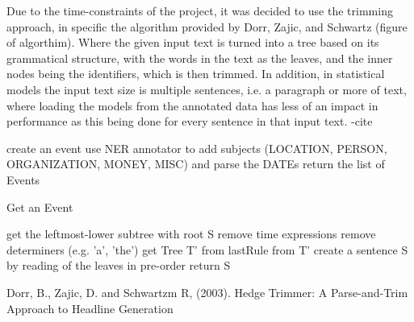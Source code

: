 \par Due to the time-constraints of the project, it was decided to use the trimming approach, in specific the algorithm provided by Dorr, Zajic, and Schwartz \cite{dorrzajicschwartz2003} (figure of algorthim). Where the given input text is turned into a tree based on its grammatical structure, with the words in the text as the leaves, and the inner nodes being the identifiers, which is then trimmed. In addition, in statistical models the input text size is multiple sentences, i.e. a paragraph or more of text, where loading the models from the annotated data has less of an impact in performance as this being done for every sentence in that input text. 
-cite
\begin{algorithm}
		create an event\;
		use NER annotator to add subjects (LOCATION, PERSON, ORGANIZATION, MONEY, MISC) and parse the DATEs\;
		return the list of Events\;	
\label{alg:getEvent}
\caption{Get an Event}
\end{algorithm}
\begin{algorithm}
	get the leftmost-lower subtree with root S\;
	remove time expressions\;
	remove determiners (e.g. 'a', 'the')\;
	get Tree T' from lastRule\;
	from T' create a sentence S by reading of the leaves in pre-order\;
	return S\;
\caption{Dorr, B., Zajic, D. and Schwartzm R, (2003). Hedge Trimmer: A Parse-and-Trim Approach to Headline Generation}
\label{alg:trim}
\end{algorithm}
